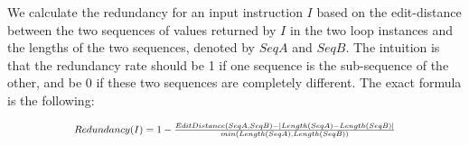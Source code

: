 We calculate the redundancy for an input instruction $I$ based on the
edit-distance between the two sequences of values returned by $I$ in the two
loop instances
and the lengths of the two sequences, denoted by $SeqA$ and $SeqB$. 
The intuition is that the redundancy rate should be 1 if one sequence is the 
sub-sequence of the other, and be 0 if these two
sequences are completely different.
The exact formula is the following:

\vspace{-0.1in}
\[
\Scale[0.8]{
	Redundancy(I) = 1 - \frac{EditDistance(SeqA, SeqB) - |Length(SeqA) - Length(SeqB)|}{min(Length(SeqA), Length(SeqB))}
}
\]





